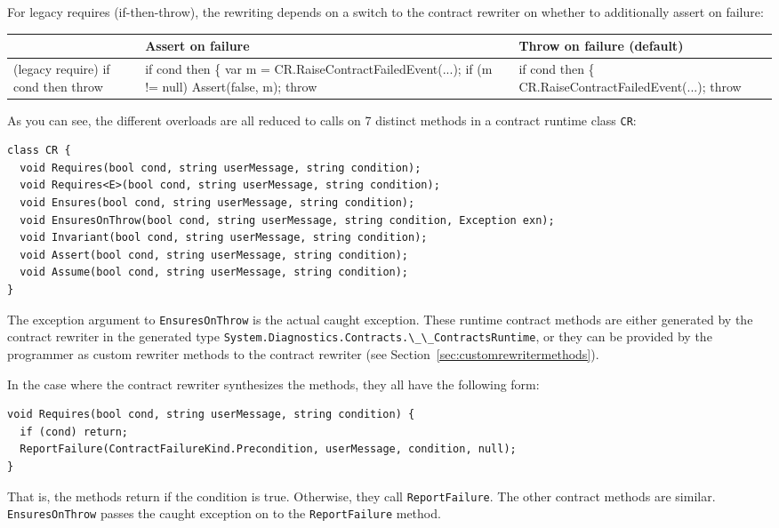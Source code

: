 \documentclass{article}
\newcommand{\code}[1]{\lstinline{#1}}
\begin{document}
For legacy requires (if-then-throw), the rewriting
depends on a switch to the contract rewriter on whether to additionally assert on failure:
\begin{center}
\small
\begin{tabular}{|l|l|l|}
\hline
 & Assert on failure & Throw on failure (default) \\
\hline
(legacy require) if cond then throw &
\multicolumn{1}{p{2in}|}{\raggedright if cond then \{
  \hspace*{1em} var m = CR.RaiseContractFailedEvent(...);
  \hspace*{1em} if (m != null) Assert(false, m);
  \hspace*{1em} throw}
  &
\multicolumn{1}{p{2in}|}{\raggedright if cond then \{
  \hspace*{1em} CR.RaiseContractFailedEvent(...); \hspace*{1em} throw} \\
\hline
\end{tabular}
\end{center}

As you can see, the different overloads are all reduced to calls on 7
distinct methods in a contract runtime class \code{CR}:
\begin{lstlisting}
class CR {
  void Requires(bool cond, string userMessage, string condition);
  void Requires<E>(bool cond, string userMessage, string condition);
  void Ensures(bool cond, string userMessage, string condition);
  void EnsuresOnThrow(bool cond, string userMessage, string condition, Exception exn);
  void Invariant(bool cond, string userMessage, string condition);
  void Assert(bool cond, string userMessage, string condition);
  void Assume(bool cond, string userMessage, string condition);
}
\end{lstlisting}
The exception argument to \code{EnsuresOnThrow} is the actual caught
exception. These runtime contract methods are either generated by
the contract rewriter in the generated type
\code{System.Diagnostics.Contracts.\_\_ContractsRuntime}, or they can be
provided by the programmer as custom rewriter methods to the
contract rewriter (see Section~\ref{sec:customrewritermethods}). 

In the case where the contract rewriter synthesizes the methods, they all have the
following form:
\begin{lstlisting}
void Requires(bool cond, string userMessage, string condition) {
  if (cond) return;
  ReportFailure(ContractFailureKind.Precondition, userMessage, condition, null);
}
\end{lstlisting}
That is, the methods return if the condition is true. Otherwise, they
call \code{ReportFailure}. The other contract methods are
similar. \code{EnsuresOnThrow} passes the caught exception on to the
\code{ReportFailure} method.
\end{document}
